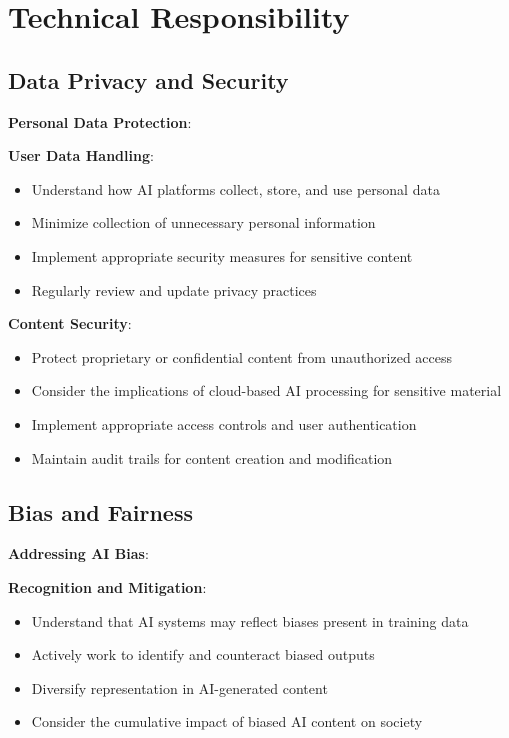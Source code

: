 \section{Technical Responsibility}

\subsection{Data Privacy and Security}
\textbf{Personal Data Protection}:

\textbf{User Data Handling}:
\begin{itemize}
\item Understand how AI platforms collect, store, and use personal data
\item Minimize collection of unnecessary personal information
\item Implement appropriate security measures for sensitive content
\item Regularly review and update privacy practices
\end{itemize}

\textbf{Content Security}:
\begin{itemize}
\item Protect proprietary or confidential content from unauthorized access
\item Consider the implications of cloud-based AI processing for sensitive material
\item Implement appropriate access controls and user authentication
\item Maintain audit trails for content creation and modification
\end{itemize}

\subsection{Bias and Fairness}
\textbf{Addressing AI Bias}:

\textbf{Recognition and Mitigation}:
\begin{itemize}
\item Understand that AI systems may reflect biases present in training data
\item Actively work to identify and counteract biased outputs
\item Diversify representation in AI-generated content
\item Consider the cumulative impact of biased AI content on society
\end{itemize}

